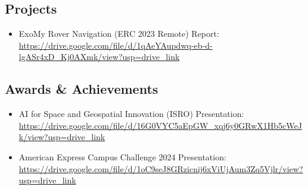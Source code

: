 \documentclass[letterpaper,10pt]{article}
\newcommand{\nbresumeItemListStart}{
  \begin{itemize}[leftmargin=0.10in, label={}, itemsep=2pt, parsep=2pt]\vspace{6pt}
}
\newcommand{\nbresumeItem}[1]{
  \item \small{#1}
}
\newcommand{\nbresumeItemListEnd}{
  \end{itemize}\vspace{-6pt}
}
\begin{document}
\subsection*{Projects}
\nbresumeItemListStart
  \nbresumeItem{ExoMy Rover Navigation (ERC 2023 Remote) \break
  {Report: \color{blue}\url{https://drive.google.com/file/d/1qAeYAupdwq-eb-d-lgASr4xD_Kj0AXmk/view?usp=drive_link}}}
\nbresumeItemListEnd

\subsection*{Awards \& Achievements}
\nbresumeItemListStart
  \nbresumeItem{AI for Space and Geospatial Innovation (ISRO) \break
  {Presentation: \color{blue}\url{https://drive.google.com/file/d/16G0VYC5aEpGW_xqj6y0GRwX1Hb5cWeJk/view?usp=drive_link}}}
  \nbresumeItem{American Express Campus Challenge 2024 \break
  {Presentation: \color{blue}\url{https://drive.google.com/file/d/1oC9seJ8GRzicnij6xViUjAum3Zq5Vjlr/view?usp=drive_link}}}
\nbresumeItemListEnd
\end{document}
